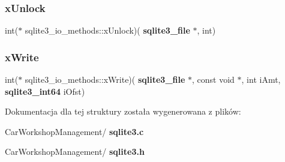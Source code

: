 \mbox{\label{structsqlite3__io__methods_ac90eeb9153eb6608a1872760660e718f}} 
\subsubsection{xUnlock}
{\footnotesize\ttfamily int($\ast$ sqlite3\+\_\+io\+\_\+methods\+::x\+Unlock)(\textbf{ sqlite3\+\_\+file} $\ast$, int)}

\mbox{\label{structsqlite3__io__methods_a803b39bc86bbff522602597fa4390e0f}} 
\subsubsection{xWrite}
{\footnotesize\ttfamily int($\ast$ sqlite3\+\_\+io\+\_\+methods\+::x\+Write)(\textbf{ sqlite3\+\_\+file} $\ast$, const void $\ast$, int i\+Amt, \textbf{ sqlite3\+\_\+int64} i\+Ofst)}



Dokumentacja dla tej struktury została wygenerowana z plików\+:\begin{DoxyCompactItemize}
\item 
Car\+Workshop\+Management/\textbf{ sqlite3.\+c}\item 
Car\+Workshop\+Management/\textbf{ sqlite3.\+h}\end{DoxyCompactItemize}
